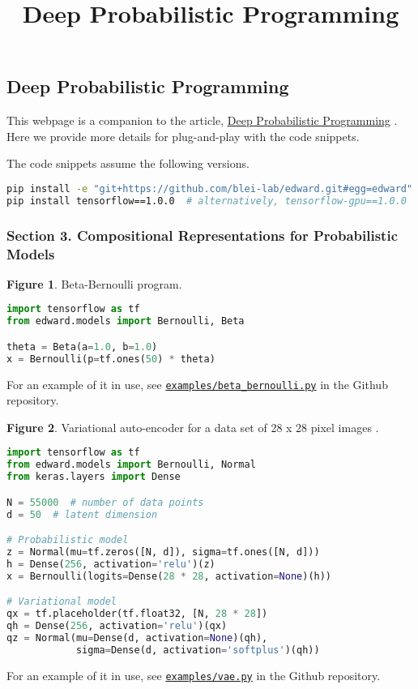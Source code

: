 \title{Deep Probabilistic Programming}

\subsection{Deep Probabilistic Programming}

This webpage is a companion to the article,
\href{https://arxiv.org/abs/1701.03757}{Deep Probabilistic Programming}
\citep{tran2017deep}.
Here we provide more details for plug-and-play with the code snippets.

The code snippets assume the following versions.

\begin{lstlisting}[language=bash]
pip install -e "git+https://github.com/blei-lab/edward.git#egg=edward"
pip install tensorflow==1.0.0  # alternatively, tensorflow-gpu==1.0.0
\end{lstlisting}

\subsubsection{Section 3. Compositional Representations for Probabilistic Models}

\textbf{Figure 1}. Beta-Bernoulli program.
\begin{lstlisting}[language=python]
import tensorflow as tf
from edward.models import Bernoulli, Beta

theta = Beta(a=1.0, b=1.0)
x = Bernoulli(p=tf.ones(50) * theta)
\end{lstlisting}
For an example of it in use, see
\href{https://github.com/blei-lab/edward/blob/master/examples/beta_bernoulli.py}{\texttt{examples/beta_bernoulli.py}}
in the Github repository.

\textbf{Figure 2}. Variational auto-encoder for a data set of 28 x 28 pixel images
\citep{kingma2014auto,rezende2014stochastic}.
\begin{lstlisting}[language=python]
import tensorflow as tf
from edward.models import Bernoulli, Normal
from keras.layers import Dense

N = 55000  # number of data points
d = 50  # latent dimension

# Probabilistic model
z = Normal(mu=tf.zeros([N, d]), sigma=tf.ones([N, d]))
h = Dense(256, activation='relu')(z)
x = Bernoulli(logits=Dense(28 * 28, activation=None)(h))

# Variational model
qx = tf.placeholder(tf.float32, [N, 28 * 28])
qh = Dense(256, activation='relu')(qx)
qz = Normal(mu=Dense(d, activation=None)(qh),
            sigma=Dense(d, activation='softplus')(qh))
\end{lstlisting}
For an example of it in use, see
\href{https://github.com/blei-lab/edward/blob/master/examples/vae.py}{\texttt{examples/vae.py}}
in the Github repository.


